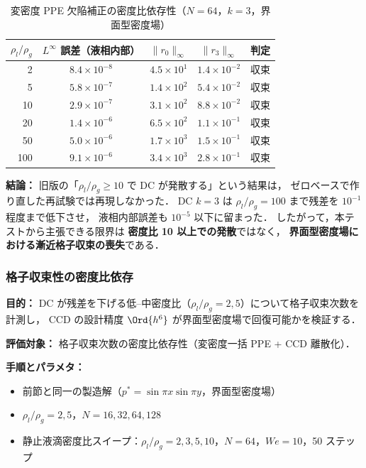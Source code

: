 \begin{table}[htbp]
\centering
\caption{変密度 PPE 欠陥補正の密度比依存性（$N = 64$，$k = 3$，界面型密度場）}
\label{tab:varrho_breakdown}
\renewcommand{\arraystretch}{1.3}
\begin{tabular}{rcccc}
\toprule
$\rho_l/\rho_g$ & $L^\infty$ 誤差（液相内部） & $\|r_0\|_\infty$ & $\|r_3\|_\infty$ & 判定 \\
\midrule
   2 & $8.4 \times 10^{-8}$ & $4.5 \times 10^{1}$ & $1.4 \times 10^{-2}$ & 収束 \\
   5 & $5.8 \times 10^{-7}$ & $1.4 \times 10^{2}$ & $5.4 \times 10^{-2}$ & 収束 \\
  10 & $2.9 \times 10^{-7}$ & $3.1 \times 10^{2}$ & $8.8 \times 10^{-2}$ & 収束 \\
  20 & $1.4 \times 10^{-6}$ & $6.5 \times 10^{2}$ & $1.1 \times 10^{-1}$ & 収束 \\
  50 & $5.0 \times 10^{-6}$ & $1.7 \times 10^{3}$ & $1.5 \times 10^{-1}$ & 収束 \\
 100 & $9.1 \times 10^{-6}$ & $3.4 \times 10^{3}$ & $2.8 \times 10^{-1}$ & 収束 \\
\bottomrule
\end{tabular}
\end{table}

\noindent\textbf{結論：}
旧版の「$\rho_l/\rho_g \geq 10$ で DC が発散する」という結果は，
ゼロベースで作り直した再試験では再現しなかった．
DC $k=3$ は $\rho_l/\rho_g = 100$ まで残差を $10^{-1}$ 程度まで低下させ，
液相内部誤差も $10^{-5}$ 以下に留まった．
したがって，本テストから主張できる限界は
\textbf{密度比 10 以上での発散}ではなく，
\textbf{界面型密度場における漸近格子収束の喪失}である．

\subsubsection{格子収束性の密度比依存}
\label{sec:varrho_grid_convergence}

\noindent\textbf{目的：}
DC が残差を下げる低--中密度比（$\rho_l/\rho_g = 2, 5$）について格子収束次数を計測し，
CCD の設計精度 $\Ord{h^6}$ が界面型密度場で回復可能かを検証する．

\noindent\textbf{評価対象：}
格子収束次数の密度比依存性（変密度一括 PPE + CCD 離散化）．

\noindent\textbf{手順とパラメタ：}
\begin{itemize}[noitemsep]
  \item 前節と同一の製造解（$p^* = \sin\pi x\sin\pi y$，界面型密度場）
  \item $\rho_l/\rho_g = 2, 5$，$N = 16, 32, 64, 128$
  \item 静止液滴密度比スイープ：$\rho_l/\rho_g = 2, 3, 5, 10$，$N = 64$，$\mathit{We} = 10$，50 ステップ
\end{itemize}

